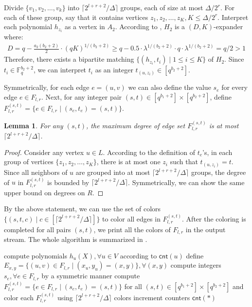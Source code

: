 \documentclass[11pt,a4paper]{article}
\newtheorem{lemma}{Lemma}[section]
\newcommand{\ceil}[1]{\lceil #1 \rceil}
\newcommand{\cnt}{\mathsf{cnt}}
\newcommand{\field}{\mathbb{F}}
\begin{document}
Divide $\{v_1, v_2, \ldots, v_k\}$ into $\ceil{2^{l+r+2} / \Delta}$ groups, each of size at most $\Delta / 2^r$. For each of these group, say that it contains vertices $z_1, z_2, \ldots, z_K, K\leq \Delta / 2^r$. Interpret each polynomial $h_{z_i}$ as a vertex in $A_2$. According to , $H_2$ is a $(D, K)$-expander where:
$$\begin{aligned}
	D = q - \frac{a_2(b_2+2)}{2}\cdot (qK)^{1 / (b_2+2)}
	\geq q - 0.5\cdot \lambda^{1 / (b_2+2)}\cdot q\cdot \lambda^{1 / (b_2+2)} = q/2 >1
\end{aligned}$$
Therefore, there exists a bipartite matching $\{(h_{z_i}, t_i)\mid 1\leq i\leq K\}$ of $H_2$. Since $t_i\in \field_q^{b_2+2}$, we can interpret $t_i$ as an integer $t_{(u, z_i)}\in [q^{b_2+2}]$.

Symmetrically, for each edge $e = (u, v)$ we can also define the value $s_e$ for every edge $e\in F_{l, r}$. Next, for any integer pair $(s, t)\in [q^{b_1+2}]\times [q^{b_2+2}]$, define $F_{l, r}^{(s, t)} = \{e\in F_{l, r}\mid (s_e, t_e) = (s, t)\}$.
\begin{lemma}
	For any $(s,  t)$, the maximum degree of edge set $F_{l, r}^{(s, t)}$ is at most $\ceil{2^{l+r+2} / \Delta}$.
\end{lemma}
\begin{proof}
	Consider any vertex $u\in L$. According to the definition of $t_e$'s, in each group of vertices $\{z_1, z_2, \ldots, z_K\}$, there is at most one $z_i$ such that $t_{(u, z_i)} = t$. Since all neighbors of $u$ are grouped into at most $\ceil{2^{l+r+2} / \Delta}$ groups, the degree of $u$ in $F_{l, r}^{(s, t)}$ is bounded by $\ceil{2^{l+r+2} / \Delta}$. Symmetrically, we can show the same upper bound on degrees on $R$.
\end{proof}

By the above statement, we can use the set of colors $\{(s, t, c)\mid c\in [\ceil{2^{l+r+2} / \Delta}]\}$ to color all edges in $F_{l, r}^{(s, t)}$. After the coloring is completed for all pairs $(s, t)$, we print all the colors of $F_{l, r}$ in the output stream. The whole algorithm is summarized in .

\begin{algorithm}
    \caption{$\textsc{DetColorHighDeg}(F)$}\label{det-alg-high}
    compute polynomials $h_u(X), \forall u\in V$ according to $\cnt(u)$\;
    define $E_{x, y} = \{(u, v)\in F_{l, r}\mid (x_u, y_u) = (x, y)\}, \forall (x, y)$\;
    \For{$u\in L$ such that $\deg_F(u)\in [2^l, 2^{l+1})$}{
        let $v_1, v_2, \ldots, v_k$ be all of $u$'s neighbor in $F_{l, r}$\;\label{distinct-neighbors}
        compute integers $t_{(u, v_i)}, 1\leq i\leq k$ using bipartite matchings\;\label{perfect-matching-high}
    }
    compute integers $s_{e}, \forall e\in F_{l, r}$ by a symmetric manner\;
    compute $F_{l, r}^{(s, t)} = \{e\in F_{l, r}\mid (s_e, t_e) = (s, t)\}$ for all $(s, t)\in [q^{b_1+2}]\times [q^{b_2+2}]$ and color each $F_{l, r}^{(s, t)}$ using $\ceil{2^{l+r+2}/\Delta}$ colors\;
    increment counters $\cnt(*)$\;
\end{algorithm}
\end{document}
